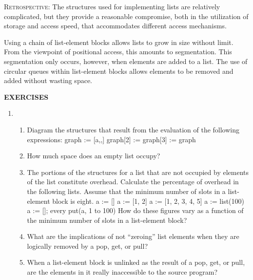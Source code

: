 \textsc{Retrospective}: The structures used for implementing lists are
relatively complicated, but they provide a reasonable compromise, both
in the utilization of storage and access speed, that accommodates
different access mechanisms.

Using a chain of list-element blocks allows lists to grow in size
without limit. From the viewpoint of positional access, this amounts
to segmentation. This segmentation only occurs, however, when elements
are added to a list. The use of circular queues within list-element
blocks allows elements to be removed and added without wasting space.

{\sffamily\bfseries
EXERCISES}

\liststyleLvi
\begin{enumerate}
\item \begin{enumerate}
\item 
Diagram the structures that result from the evaluation of the
following expressions:\newline
 graph := [{\textquotedbl}a{\textquotedbl},,]\newline
 graph[2] := graph[3] := graph

\item How much space does an empty list occupy?

\item The portions of the structures for a list that are not occupied
by elements of the list constitute overhead. Calculate the percentage
of overhead in the following lists. Assume that the minimum number of
slots in a list-element block is eight.\newline
 a := []\newline
 a := [1, 2]\newline
 a := [1, 2, 3, 4, 5]\newline
 a := list(100)\newline
 a := []; every put(a, 1 to 100)\newline
How do these figures vary as a function of the minimum number of slots
in a list-element block?

\item What are the implications of not ``zeroing'' list elements when
they are logically removed by a pop, get, or pull?

\item When a list-element block is unlinked as the result of a pop,
get, or pull, are the elements in it really inaccessible to the
source program?


\end{enumerate}
\end{enumerate}
